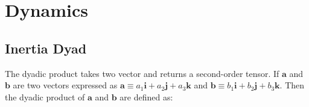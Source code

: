 \chapter{Dynamics}
\section{Inertia Dyad}
\label{app:dyad}
The dyadic product takes two vector and returns a second-order tensor. If $\mathbf{a}$ and $\mathbf{b}$ are two vectors expressed as $\mathbf{a} \equiv a_1 \mathbf{i} + a_2\mathbf{j}+a_3\mathbf{k}$ and $\mathbf{b} \equiv b_1 \mathbf{i} + b_2\mathbf{j}+b_3\mathbf{k}$. Then the dyadic product of $\mathbf{a}$ and $\mathbf{b}$ are defined as:

